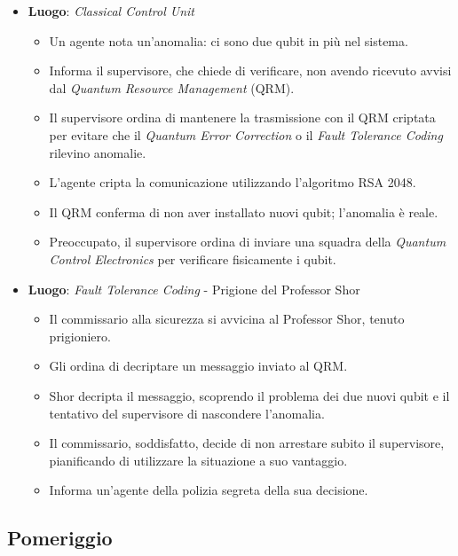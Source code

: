 \begin{itemize}
    \item \textbf{Luogo}: \emph{Classical Control Unit}
    \begin{itemize}
        \item Un agente nota un'anomalia: ci sono due qubit in più nel sistema.
        \item Informa il supervisore, che chiede di verificare, non avendo ricevuto avvisi dal \emph{Quantum Resource Management} (QRM).
        \item Il supervisore ordina di mantenere la trasmissione con il QRM criptata per evitare che il \emph{Quantum Error Correction} o il \emph{Fault Tolerance Coding} rilevino anomalie.
        \item L'agente cripta la comunicazione utilizzando l'algoritmo RSA 2048.
        \item Il QRM conferma di non aver installato nuovi qubit; l'anomalia è reale.
        \item Preoccupato, il supervisore ordina di inviare una squadra della \emph{Quantum Control Electronics} per verificare fisicamente i qubit.
    \end{itemize}
    
    \item \textbf{Luogo}: \emph{Fault Tolerance Coding} - Prigione del Professor Shor
    \begin{itemize}
        \item Il commissario alla sicurezza si avvicina al Professor Shor, tenuto prigioniero.
        \item Gli ordina di decriptare un messaggio inviato al QRM.
        \item Shor decripta il messaggio, scoprendo il problema dei due nuovi qubit e il tentativo del supervisore di nascondere l'anomalia.
        \item Il commissario, soddisfatto, decide di non arrestare subito il supervisore, pianificando di utilizzare la situazione a suo vantaggio.
        \item Informa un'agente della polizia segreta della sua decisione.
    \end{itemize}
\end{itemize}

\subsection*{Pomeriggio}

